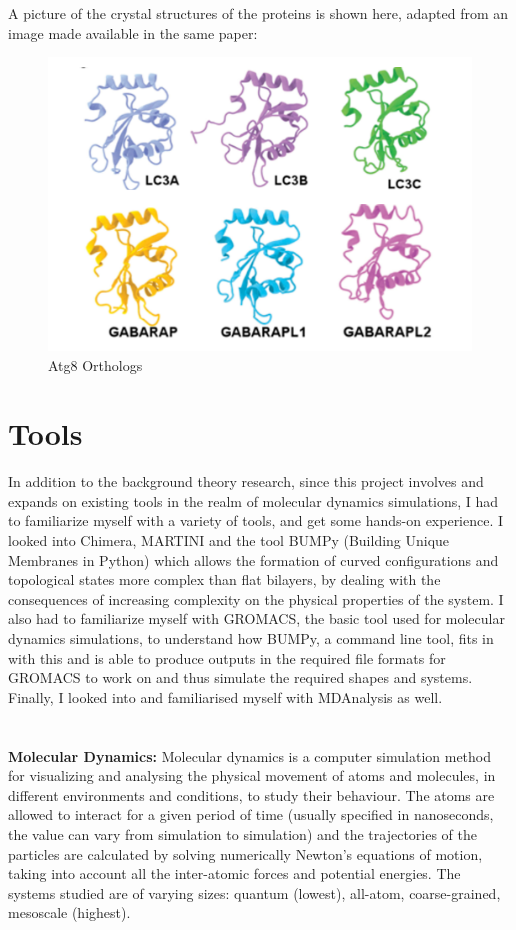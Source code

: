 \documentclass[12pt, a4paper]{report}
\begin{document}
\clearpage
A picture of the crystal structures of the proteins is shown here, adapted from an image made available in the same paper: 
\begin{figure}[h]
\includegraphics[scale=0.5]{images/atg.png} 
\centering 
\caption{Atg8 Orthologs} 
\centering 
\end{figure} 

\clearpage 
\section*{Tools} 

In addition to the background theory research, since this project involves and expands on existing tools in the realm of molecular dynamics simulations, I had to familiarize myself with a variety of tools, and get some hands-on experience. I looked into Chimera, MARTINI and the tool BUMPy (Building Unique Membranes in Python) which allows the formation of curved configurations and topological states more complex than flat bilayers, by dealing with the consequences of increasing complexity on the physical properties of the system. I also had to familiarize myself with GROMACS, the basic tool used for molecular dynamics simulations, to understand how BUMPy, a command line tool, fits in with this and is able to produce outputs in the required file formats for GROMACS to work on and thus simulate the required shapes and systems. Finally, I looked into and familiarised myself with MDAnalysis as well. 
\\~\\~\\
\textbf{Molecular Dynamics:} Molecular dynamics is a computer simulation method for visualizing and analysing the physical movement of atoms and molecules, in different environments and conditions, to study their behaviour. The atoms are allowed to interact for a given period of time (usually specified in nanoseconds, the value can vary from simulation to simulation) and the trajectories of the particles are calculated by solving numerically Newton’s equations of motion, taking into account all the inter-atomic forces and potential energies. The systems studied are of varying sizes: quantum (lowest), all-atom, coarse-grained, mesoscale (highest). 
\\~\\~\\~\\ 
\end{document}
